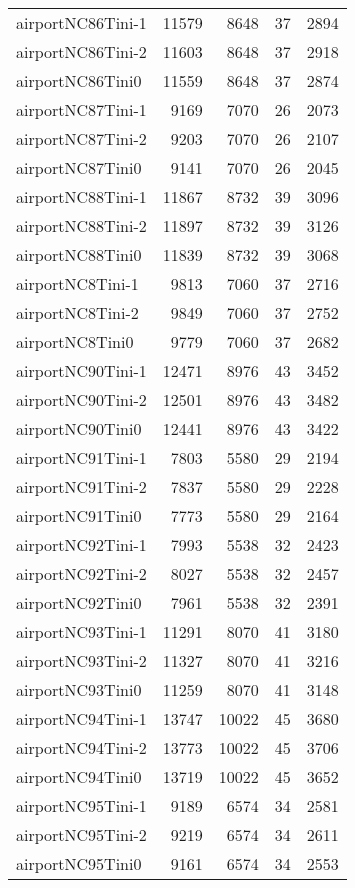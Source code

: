 \begin{longtable}{lrrrr}
airportNC86Tini-1 & 11579 & 8648 & 37 & 2894 \\
airportNC86Tini-2 & 11603 & 8648 & 37 & 2918 \\
airportNC86Tini0 & 11559 & 8648 & 37 & 2874 \\
airportNC87Tini-1 & 9169 & 7070 & 26 & 2073 \\
airportNC87Tini-2 & 9203 & 7070 & 26 & 2107 \\
airportNC87Tini0 & 9141 & 7070 & 26 & 2045 \\
airportNC88Tini-1 & 11867 & 8732 & 39 & 3096 \\
airportNC88Tini-2 & 11897 & 8732 & 39 & 3126 \\
airportNC88Tini0 & 11839 & 8732 & 39 & 3068 \\
airportNC8Tini-1 & 9813 & 7060 & 37 & 2716 \\
airportNC8Tini-2 & 9849 & 7060 & 37 & 2752 \\
airportNC8Tini0 & 9779 & 7060 & 37 & 2682 \\
airportNC90Tini-1 & 12471 & 8976 & 43 & 3452 \\
airportNC90Tini-2 & 12501 & 8976 & 43 & 3482 \\
airportNC90Tini0 & 12441 & 8976 & 43 & 3422 \\
airportNC91Tini-1 & 7803 & 5580 & 29 & 2194 \\
airportNC91Tini-2 & 7837 & 5580 & 29 & 2228 \\
airportNC91Tini0 & 7773 & 5580 & 29 & 2164 \\
airportNC92Tini-1 & 7993 & 5538 & 32 & 2423 \\
airportNC92Tini-2 & 8027 & 5538 & 32 & 2457 \\
airportNC92Tini0 & 7961 & 5538 & 32 & 2391 \\
airportNC93Tini-1 & 11291 & 8070 & 41 & 3180 \\
airportNC93Tini-2 & 11327 & 8070 & 41 & 3216 \\
airportNC93Tini0 & 11259 & 8070 & 41 & 3148 \\
airportNC94Tini-1 & 13747 & 10022 & 45 & 3680 \\
airportNC94Tini-2 & 13773 & 10022 & 45 & 3706 \\
airportNC94Tini0 & 13719 & 10022 & 45 & 3652 \\
airportNC95Tini-1 & 9189 & 6574 & 34 & 2581 \\
airportNC95Tini-2 & 9219 & 6574 & 34 & 2611 \\
airportNC95Tini0 & 9161 & 6574 & 34 & 2553 \\

\end{longtable}
